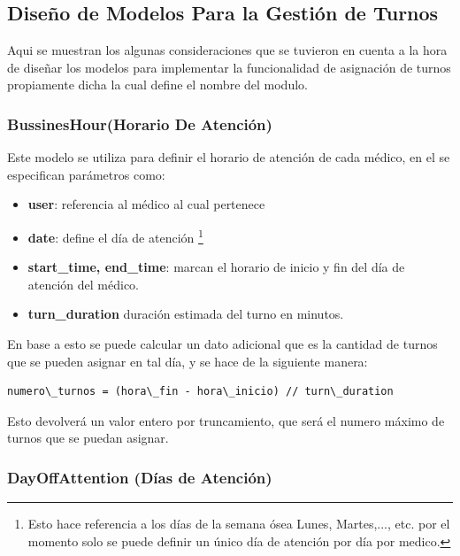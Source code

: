 
\subsection{Diseño de Modelos Para la Gestión de Turnos}

Aqui se muestran los algunas consideraciones que se tuvieron en cuenta a la hora de diseñar los modelos para implementar la funcionalidad de asignación de turnos propiamente dicha la cual define el nombre del modulo. 


\subsubsection{BussinesHour(Horario De Atención)}

Este modelo se utiliza para definir el horario de atención de cada médico, en el se especifican parámetros como:

\begin{itemize}
    \item \textbf{user}: referencia al médico al cual pertenece 
    \item \textbf{date}: define el día de atención \footnote{Esto hace  referencia a los días de la semana ósea Lunes, Martes,..., etc. por el momento solo se puede definir un único día de atención por día por medico.}
    \item \textbf{start\_time, end\_time}: marcan el horario de inicio y fin del  día de atención del médico.
    \item \textbf{turn\_duration} duración estimada del turno en minutos.
\end{itemize}

En base a esto se puede calcular un dato adicional que es la cantidad de turnos que se pueden asignar en tal día, y se hace de la siguiente manera:

\begin{lstlisting}
numero\_turnos = (hora\_fin - hora\_inicio) // turn\_duration
\end{lstlisting}

Esto devolverá un valor entero por truncamiento, que será el numero máximo de turnos que se puedan asignar.


\subsubsection{DayOffAttention (Días de Atención)}

